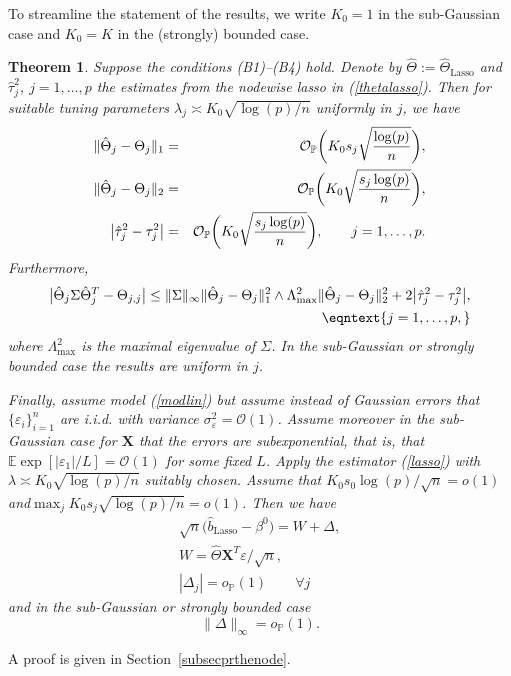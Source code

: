 \documentclass[aos,MSNbibl,dvips]{arximspdf}
\newtheorem{theo}{Theorem}[section]
\newcommand{\PP}{\mathbb{P}}
\newcommand{\EE}{\mathbb{E}}
\newcommand{\bx}{\mathbf{X}}
\begin{document}
To streamline the statement of the results, we
write $K_0=1$ in the sub-Gaussian case and $K_0 = K$ in the (strongly)
bounded case.

\begin{theo} \label{nodetheorem} Suppose the conditions \textup{(B1)--(B4)}
hold. Denote by $\hat{\Theta}:= \hat\Theta_{\mathrm{Lasso}} $ and
$\hat{\tau}_j^2$, $j=1, \ldots, p$ the estimates from
the nodewise lasso in (\ref{thetalasso}). Then for suitable tuning
parameters $\lambda_j
\asymp K_0 \sqrt{ \log(p)/ n } $ uniformly in $j$, we have
%
\begin{eqnarray*}
\| \hat\Theta_j - \Theta_j
\|_1& =& {\mathcal O}_{\PP} \biggl( K_0
s_j \sqrt{\log(p) \over n } \biggr), \\
\| \hat
\Theta_j - \Theta_j \|_2 &= &{\mathcal
O}_{\PP} \biggl( K_0 \sqrt{s_j \log(p)\over n } \biggr),
\\
\bigl| \hat\tau_j^2 -
\tau_j^2\bigr| &=& {\mathcal O}_{\PP} \biggl(
K_0 \sqrt{s_j \log(p) \over n } \biggr),\qquad j=1, \ldots, p.
\end{eqnarray*}
%
Furthermore,
%
\begin{eqnarray}
\bigl| \hat\Theta_j \Sigma\hat\Theta_j^T -
\Theta_{j,j} \bigr| \le \| \Sigma\|_{\infty} \| \hat
\Theta_j - \Theta_j \|_1^2
\wedge \Lambda _\mathrm{max}^2 \| \hat\Theta_j -
\Theta_j \|_2^2 + 2\bigl| \hat
\tau_j^2 - \tau_j^2\bigr|,\nonumber\\
 \eqntext{j=1,
\ldots, p,} %
\end{eqnarray}
%
where $\Lambda_\mathrm{max}^2$ is the maximal eigenvalue of $\Sigma$.
In the sub-Gaussian or
strongly bounded case the results are uniform in $j$.

Finally, assume model (\ref{modlin}) but assume instead of Gaussian
errors that $\{ \varepsilon_i \}_{i=1}^n$ are i.i.d. with
variance $\sigma_{\varepsilon}^2 = {\mathcal O} (1)$. Assume moreover in
the sub-Gaussian case for $\bx$ that the
errors are subexponential, that is, that\break $\EE\exp[ |\varepsilon_1 | /  L
] = {\mathcal O} (1)$
for some fixed $L$.
Apply the estimator (\ref{lasso}) with $\lambda\asymp K_0 \sqrt{
\log
(p) / n}$ suitably chosen. Assume that
$K_0 s_0 \log(p) / \sqrt n = o(1)$ and\break  $\max_j K_0 s_j \sqrt{\log
(p)/n} = o(1)$. Then
we have
%
\begin{eqnarray*}
& \sqrt{n}\bigl(\hat{b}_{\mathrm{Lasso}} - \beta^0\bigr) = W +
\Delta,&
\\
& W= \hat\Theta\bx^T \varepsilon/\sqrt n,&
\\
& | \Delta_j | =o_{\PP}(1) \qquad\forall j&
\end{eqnarray*}
%
and in the sub-Gaussian or strongly bounded case
%
\[
\| \Delta\|_{\infty} = o_{\PP}(1). %
\]
%
\end{theo}
%
A proof is given in Section~\ref{subsecprthenode}.
\end{document}
